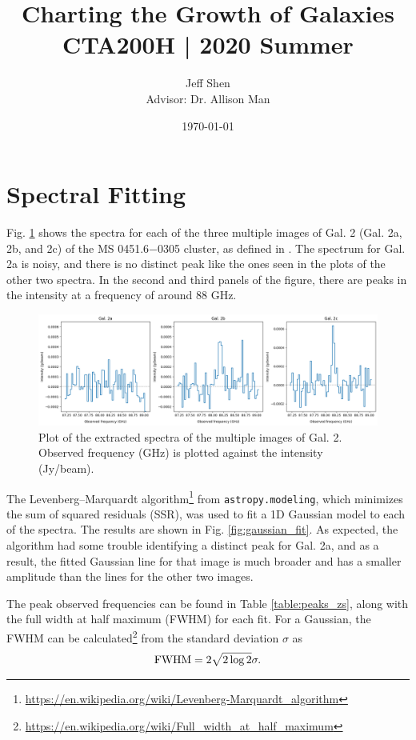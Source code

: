 \documentclass[11pt]{article}
\newcommand{\code}{\texttt}
\begin{document}
\title{\textbf{Charting the Growth of Galaxies} \\[0.25cm] \large{CTA200H | 2020 Summer}}
\author{Jeff Shen \\ Advisor: Dr. Allison Man}
\date{\today}
\maketitle

\section*{Spectral Fitting}

Fig. \ref{fig:initial_spectra} shows the spectra for each of the three multiple images of Gal. 2 (Gal. 2a, 2b, and 2c) of the MS 0451.6−0305 cluster, as defined in \cite{MacKenzie2014}. The spectrum for Gal. 2a is noisy, and there is no distinct peak like the ones seen in the plots of the other two spectra. In the second and third panels of the figure, there are peaks in the intensity at a frequency of around 88 GHz. 


\begin{figure}[!htbp]
    \centering
    \includegraphics[width=\linewidth]{../figs/initial_spectra.png}
	\caption{Plot of the extracted spectra of the multiple images of Gal. 2. Observed frequency (GHz) is plotted against the intensity (Jy/beam).}
    \label{fig:initial_spectra}
\end{figure}

The Levenberg–Marquardt algorithm\footnote{\url{https://en.wikipedia.org/wiki/Levenberg-Marquardt_algorithm}} from \code{astropy.modeling}, which minimizes the sum of squared residuals (SSR), was used to fit a 1D Gaussian model to each of the spectra. The results are shown in Fig. \ref{fig:gaussian_fit}. As expected, the algorithm had some trouble identifying a distinct peak for Gal. 2a, and as a result, the fitted Gaussian line for that image is much broader and has a smaller amplitude than the lines for the other two images.

The peak observed frequencies can be found in Table \ref{table:peaks_zs}, along with the full width at half maximum (FWHM) for each fit. For a Gaussian, the FWHM can be calculated\footnote{\url{https://en.wikipedia.org/wiki/Full_width_at_half_maximum}} from the standard deviation $\sigma$ as 
\begin{align}\label{eqn:fwhm}
	\rm{FWHM} = 2\sqrt{2\log{2}}\sigma.
\end{align}
\end{document}
